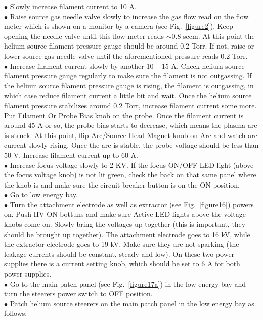 \documentclass{article}
\begin{document}
$\bullet$ Slowly increase filament current to 10 A.\\
$\bullet$ Raise source gas needle valve slowly to increase the gas flow read on the flow meter which is shown on a monitor by a camera (see Fig.~\ref{figure2}). Keep opening the needle valve until this flow meter reads $\sim$0.8 sccm. At this point the helium source filament pressure gauge should be around 0.2 Torr. If not, raise or lower source gas needle valve until the aforementioned pressure reads 0.2 Torr.\\
$\bullet$ Increase filament current slowly by another 10 -- 15 A. Check helium source filament pressure gauge regularly to make sure the filament is not outgassing. If the helium source filament pressure gauge is rising, the filament is outgassing, in which case reduce filament current a little bit and wait. Once the helium source filament pressure stabilizes around 0.2 Torr, increase filament current some more. Put Filament Or Probe Bias knob on the probe. Once the filament current is around 45 A or so, the probe bias starts to decrease, which means the plasma arc is struck. At this point, flip Arc/Source Head Magnet knob on Arc and watch arc current slowly rising. Once the arc is stable, the probe voltage should be less than 50 V. Increase filament current up to 60 A.\\
$\bullet$ Increase focus voltage slowly to 2 KV. If the focus ON/OFF LED light (above the focus voltage knob) is not lit green, check the back on that same panel where the knob is and make sure the circuit breaker button is on the ON position.\\
$\bullet$ Go to low energy bay.\\
$\bullet$ Turn the attachment electrode as well as extractor (see Fig.~\ref{figure16}) powers on. Push HV ON bottuns and make sure Active LED lights above the voltage knobs come on. Slowly bring the voltages up together (this is important, they should be brought up together). The attachment electrode goes to 16 kV, while the extractor electrode goes to 19 kV. Make sure they are not sparking (the leakage currents should be constant, steady and low). On these two power supplies there is a current setting knob, which should be set to 6 A for both power supplies.\\
$\bullet$ Go to the main patch panel (see Fig.~\ref{figure17a}) in the low energy bay and turn the steerers power switch to OFF position.\\
$\bullet$ Patch helium source steerers on the main patch panel in the low energy bay as follows:
\end{document}
